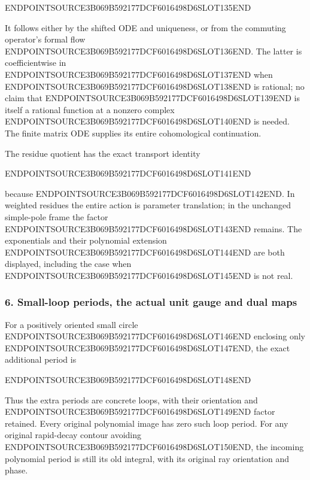 ENDPOINTSOURCE3B069B592177DCF6016498D6SLOT135END

It follows either by the shifted ODE and uniqueness, or from the commuting operator's formal flow ENDPOINTSOURCE3B069B592177DCF6016498D6SLOT136END. The latter is coefficientwise in ENDPOINTSOURCE3B069B592177DCF6016498D6SLOT137END when ENDPOINTSOURCE3B069B592177DCF6016498D6SLOT138END is rational; no claim that ENDPOINTSOURCE3B069B592177DCF6016498D6SLOT139END is itself a rational function at a nonzero complex ENDPOINTSOURCE3B069B592177DCF6016498D6SLOT140END is needed. The finite matrix ODE supplies its entire cohomological continuation.

The residue quotient has the exact transport identity

ENDPOINTSOURCE3B069B592177DCF6016498D6SLOT141END

because ENDPOINTSOURCE3B069B592177DCF6016498D6SLOT142END. In weighted residues the entire action is parameter translation; in the unchanged simple-pole frame the factor ENDPOINTSOURCE3B069B592177DCF6016498D6SLOT143END remains. The exponentials and their polynomial extension ENDPOINTSOURCE3B069B592177DCF6016498D6SLOT144END are both displayed, including the case when ENDPOINTSOURCE3B069B592177DCF6016498D6SLOT145END is not real.

\subsubsection{6. Small-loop periods, the actual unit gauge and dual maps}\label{endpoint-analytic_pole--small-loop-periods-the-actual-unit-gauge-and-dual-maps}

For a positively oriented small circle ENDPOINTSOURCE3B069B592177DCF6016498D6SLOT146END enclosing only ENDPOINTSOURCE3B069B592177DCF6016498D6SLOT147END, the exact additional period is

ENDPOINTSOURCE3B069B592177DCF6016498D6SLOT148END

Thus the extra periods are concrete loops, with their orientation and ENDPOINTSOURCE3B069B592177DCF6016498D6SLOT149END factor retained. Every original polynomial image has zero such loop period. For any original rapid-decay contour avoiding ENDPOINTSOURCE3B069B592177DCF6016498D6SLOT150END, the incoming polynomial period is still its old integral, with its original ray orientation and phase.

